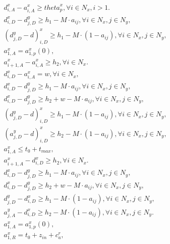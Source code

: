 \begin{align}
  & d_{i , A}^{x} - a_{i , A}^{x} \geq \mathit{theta}_{p}^{x} , \forall i \in N_{x} , i > 1 . \tag{eq\_0037} \\
  & d_{i , D}^{x} - d_{j , D}^{y} \geq h_{1} - M \cdot a_{i j} , \forall i \in N_{x} , j \in N_{y} , \tag{eq\_0038} \\
  & \left(d_{j , D}^{y} - d\right)_{i , D}^{x} \geq h_{1} - M \cdot \left(1 - a_{i j}\right) , \forall i \in N_{x} , j \in N_{y} , \tag{eq\_0039} \\
  & a_{1 , A}^{x} = a_{1 , p}^{x} \left(0\right) , \tag{eq\_0040} \\
  & a_{i + 1 , A}^{x} - a_{i , A}^{x} \geq h_{2} , \forall i \in N_{x} . \tag{eq\_0041} \\
  & d_{i , D}^{x} - a_{i , A}^{x} = w , \forall i \in N_{x} , \tag{eq\_0042} \\
  & d_{i , D}^{x} - d_{j , D}^{y} \geq h_{1} - M \cdot a_{i j} , \forall i \in N_{x} , j \in N_{y} , \tag{eq\_0043} \\
  & d_{i , D}^{x} - d_{j , D}^{y} \geq h_{2} + w - M \cdot a_{i j} , \forall i \in N_{x} , j \in N_{y} , \tag{eq\_0044} \\
  & \left(d_{j , D}^{y} - d\right)_{i , D}^{x} \geq h_{1} - M \cdot \left(1 - a_{i j}\right) , \forall i \in N_{x} , j \in N_{y} , \tag{eq\_0045} \\
  & \left(a_{j , D}^{y} - d\right)_{i , D}^{x} \geq h_{2} - M \cdot \left(1 - a_{i j}\right) , \forall i \in N_{x} , j \in N_{y} , \tag{eq\_0046} \\
  & a_{1 , A}^{x} \leq t_{0} + t_{\mathit{max}} , \tag{eq\_0047} \\
  & a_{i + 1 , A}^{x} - d_{i , D}^{x} \geq h_{2} , \forall i \in N_{x} . \tag{eq\_0048} \\
  & d_{i , D}^{x} - d_{j , D}^{y} \geq h_{1} - M \cdot a_{i j} , \forall i \in N_{x} , j \in N_{y} , \tag{eq\_0049} \\
  & d_{i , D}^{x} - d_{j , D}^{y} \geq h_{2} + w - M \cdot a_{i j} , \forall i \in N_{x} , j \in N_{y} , \tag{eq\_0050} \\
  & d_{j , D}^{y} - d_{i , D}^{x} \geq h_{1} - M \cdot \left(1 - a_{i j}\right) , \forall i \in N_{x} , j \in N_{y} , \tag{eq\_0051} \\
  & a_{j , A}^{y} - d_{i , D}^{x} \geq h_{2} - M \cdot \left(1 - a_{i j}\right) , \forall i \in N_{x} , j \in N_{y} . \tag{eq\_0052} \\
  & a_{1 , A}^{x} = a_{1 , p}^{x} \left(0\right) , \tag{eq\_0053} \\
  & a_{1 , R}^{x} = t_{0} + z_{i n} + c_{a}^{r} , \tag{eq\_0054} \\

\end{align}
